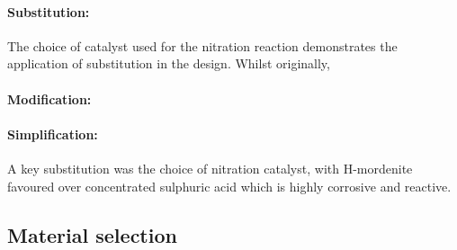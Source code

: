 \paragraph{Substitution:} The choice of catalyst used for the nitration reaction demonstrates the application of substitution in the design. Whilst originally, 



\paragraph{Modification:}


\paragraph{Simplification:} 


     A key substitution was the choice of nitration catalyst, with H-mordenite favoured over concentrated sulphuric acid which is highly corrosive and reactive.  




\subsection{Material selection}
